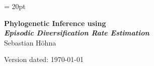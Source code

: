 \documentclass[11pt]{article}
\begin{document}
\renewcommand{\headrulewidth}{0.5pt}
\headsep = 20pt
\lhead{ }

\thispagestyle{plain}
\begin{center}

\textbf{\LARGE Phylogenetic Inference using \RevBayes}\\\vspace{2mm}
\textbf{\it{\Large Episodic Diversification Rate Estimation}}\\\vspace{2mm}
\vspace{1cm}
{\Large Sebastian H{\"o}hna}
\vspace{1cm}
\end{center}

\def \ResourcePath {./}
\def \GlobalResourcePath {../}



Version dated: \today
\end{document}
